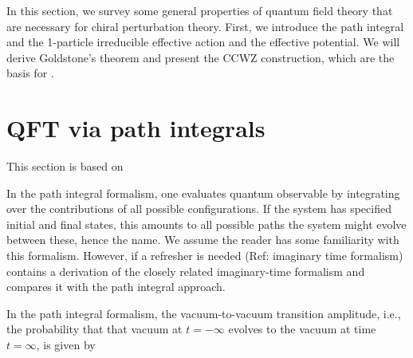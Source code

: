 In this section, we survey some general properties of quantum field theory that are necessary for chiral perturbation theory.
First, we introduce the path integral and the 1-particle irreducible effective action and the effective potential.
We will derive Goldstone's theorem and present the CCWZ construction, which are the basis for \chpt.

\section[QFT via path integrals*]{QFT via path integrals}
\label{section:path integral}

This section is based on \autocite{peskinIntroductionQuantumField1995,weinbergQuantumTheoryFields1995,weinbergQuantumTheoryFields1996,schwartzQuantumFieldTheory2013}

In the path integral formalism, one evaluates quantum observable by integrating over the contributions of all possible configurations.
If the system has specified initial and final states, this amounts to all possible paths the system might evolve between these, hence the name.
We assume the reader has some familiarity with this formalism. 
However, if a refresher is needed (Ref: imaginary time formalism)
contains a derivation of the closely related imaginary-time formalism and compares it with the path integral approach.

In the path integral formalism, the vacuum-to-vacuum transition amplitude, i.e., the probability that that vacuum at $t = -\infty$ evolves to the vacuum at time $t = \infty$, is given by

